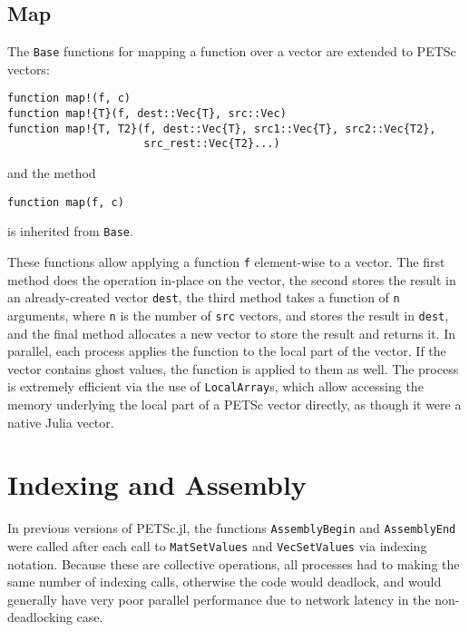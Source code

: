 \documentclass{article}
\begin{document}
\subsection{Map}
The \texttt{Base} functions for mapping a function over a vector are extended
to PETSc vectors:

\begin{verbatim}
function map!(f, c)
function map!{T}(f, dest::Vec{T}, src::Vec)
function map!{T, T2}(f, dest::Vec{T}, src1::Vec{T}, src2::Vec{T2},  
                     src_rest::Vec{T2}...)
\end{verbatim}

\noindent and the method
\begin{verbatim}
function map(f, c)
\end{verbatim}

\noindent is inherited from \texttt{Base}.

These functions allow applying a function \texttt{f} element-wise to a vector.
The first method does the operation in-place on the vector, the second stores
the result in an already-created vector \texttt{dest}, the third method 
takes a function of \texttt{n} arguments, where \texttt{n} is the number of
\texttt{src} vectors, and stores the result in \texttt{dest}, and the final 
method allocates a new vector to store the result and returns it.
In parallel, each process applies the function to the local part of the vector.
If the vector contains ghost values, the function is applied to them as well.
The process is extremely efficient via the use of \texttt{LocalArray}s, which
allow accessing the memory underlying the local part of a PETSc vector directly,
as though it were a native Julia vector.

\section{Indexing and Assembly}
In previous versions of PETSc.jl, the functions \texttt{AssemblyBegin} and 
\texttt{AssemblyEnd} were called after each call to \texttt{MatSetValues} and
\texttt{VecSetValues} via indexing notation.  Because these are collective 
operations, all processes had to making the same number of indexing calls, 
otherwise the code would deadlock, and would generally have very poor parallel
performance due to network latency in the non-deadlocking case.
\end{document}
